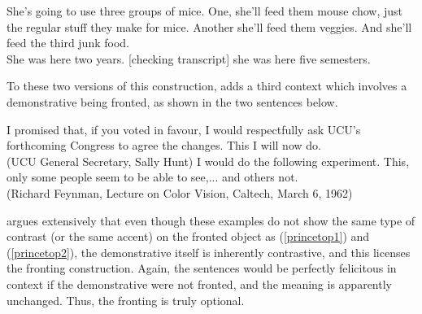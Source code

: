 \begin{exe}
\ex \label{untop1} She's going to use three groups of mice.
One, she'll feed them mouse chow, just the regular stuff they make for
mice.
Another she'll feed them veggies.
And she'll feed the third junk food.\\

\ex \label{untop2} She was here two years.
[checking transcript] she was here five semesters.\\

\end{exe}


To these two versions of this construction, \citet{caitldiss} adds a third context which involves a demonstrative being fronted, as shown in the two sentences below.


\begin{exe}
\ex \label{dem1} I promised that, if you voted in favour, I would respectfully ask UCU's forthcoming Congress to agree the changes.
This I will now do.\\
(UCU General Secretary, Sally Hunt)
\ex \label{dem2} I would do the following experiment.
This, only some people seem to be able to see,... and others not.\\
(Richard Feynman, Lecture on Color Vision, Caltech, March 6, 1962)
\end{exe}

\noindent \citet{caitldiss} argues extensively that even though these examples do not show the same type of contrast (or the same accent) on the fronted object as (\ref{princetop1}) and (\ref{princetop2}), the demonstrative itself is inherently contrastive, and this licenses the fronting construction.
Again, the sentences would be perfectly felicitous in context if the demonstrative were not fronted, and the meaning is apparently unchanged.
Thus, the fronting is truly optional.

